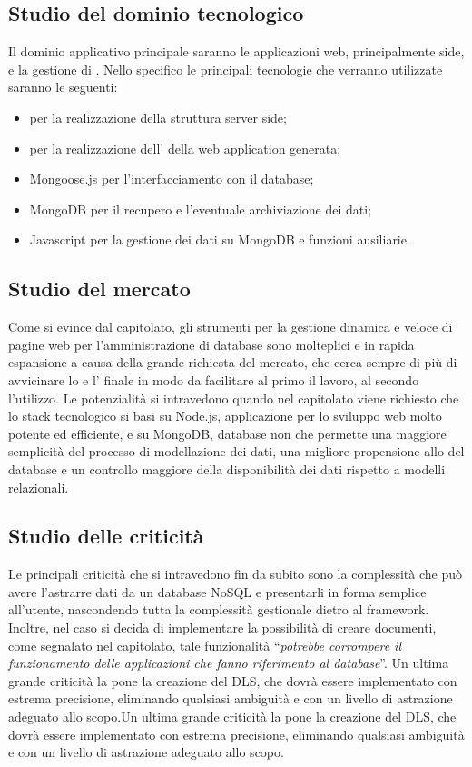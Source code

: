 \subsection{Studio del dominio tecnologico} %
\label{2.2}
Il dominio applicativo principale saranno le applicazioni web, principalmente  side, e la gestione di .
Nello specifico le principali tecnologie che verranno utilizzate saranno le seguenti:
\begin{itemize}
\item {} per la realizzazione della struttura server side;
\item {} per la realizzazione dell' della web application generata;
\item Mongoose.js  per l'interfacciamento con il database;
\item MongoDB per il recupero e l'eventuale archiviazione dei dati;
\item Javascript per la gestione dei dati su MongoDB e funzioni ausiliarie.
\end{itemize}
\subsection{Studio del mercato}
\label{2.3}
Come si evince dal capitolato, gli strumenti per la gestione dinamica e veloce di pagine web per l'amministrazione di database  sono molteplici e in rapida espansione a causa della grande richiesta del mercato, che cerca sempre di più di avvicinare lo  e l' finale in modo da facilitare al primo il lavoro, al secondo l'utilizzo. Le potenzialità si intravedono quando nel capitolato viene richiesto che lo stack tecnologico si basi su Node.js, applicazione per lo sviluppo web molto potente ed efficiente, e su MongoDB, database non  che permette una maggiore semplicità del processo di modellazione dei dati, una migliore propensione allo  del database e un controllo maggiore della disponibilità dei dati rispetto a modelli relazionali.
\subsection{Studio delle criticità}
\label{2.4}
Le principali criticità che si intravedono fin da subito sono la complessità che può avere l'astrarre dati da un database NoSQL e presentarli in forma semplice all'utente, nascondendo tutta la complessità gestionale dietro al framework.
Inoltre, nel caso si decida di implementare la possibilità di creare documenti, come segnalato nel capitolato, tale funzionalità “\emph {potrebbe corrompere il funzionamento delle applicazioni che fanno riferimento al database}”.
Un ultima grande criticità la pone la creazione del DLS, che dovrà essere implementato con estrema precisione, eliminando qualsiasi ambiguità e con un  livello di astrazione adeguato allo scopo.Un ultima grande criticità la pone la creazione del DLS, che dovrà essere implementato con estrema precisione, eliminando qualsiasi ambiguità e con un  livello di astrazione adeguato allo scopo.
